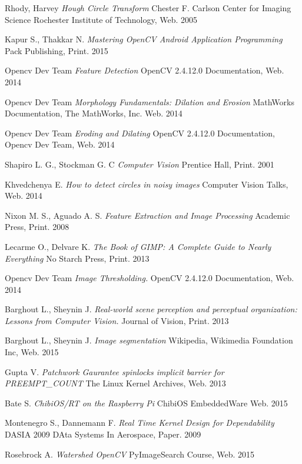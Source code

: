 \documentclass[12pt,twoside,a4paper]{article}
\begin{document}
\begin{thebibliography}{9}
Rhody, Harvey
\textit{Hough Circle Transform} Chester F. Carlson Center for Imaging Science Rochester Institute of Technology, Web. 2005

Kapur S., Thakkar N.
\textit{Mastering OpenCV Android Application Programming} Pack Publishing, Print. 2015

Opencv Dev Team
\textit{Feature Detection} OpenCV 2.4.12.0 Documentation, Web. 2014

Opencv Dev Team
\textit{Morphology Fundamentals: Dilation and Erosion} MathWorks Documentation, The MathWorks, Inc. Web. 2014

Opencv Dev Team
\textit{Eroding and Dilating} OpenCV 2.4.12.0 Documentation, Opencv Dev Team, Web. 2014

Shapiro L. G., Stockman G. C
\textit{Computer Vision} Prentice Hall, Print. 2001

Khvedchenya E.
\textit{How to detect circles in noisy images} Computer Vision Talks, Web. 2014

Nixon M. S., Aguado A. S.
\textit{Feature Extraction and Image Processing} Academic Press, Print. 2008

Lecarme  O., Delvare K.
\textit{The Book of GIMP: A Complete Guide to Nearly Everything} No Starch Press, Print. 2013

Opencv Dev Team
\textit{Image Thresholding.} OpenCV 2.4.12.0 Documentation, Web. 2014

Barghout L., Sheynin J.
\textit{Real-world scene perception and perceptual organization: Lessons from Computer Vision.} Journal of Vision, Print. 2013

Barghout L., Sheynin J.
\textit{Image segmentation} Wikipedia, Wikimedia Foundation Inc, Web. 2015

Gupta V.
\textit{Patchwork Gaurantee spinlocks implicit barrier for PREEMPT\_COUNT} The Linux Kernel Archives, Web. 2013

Bate S.
\textit{ChibiOS/RT on the Raspberry Pi} ChibiOS EmbeddedWare Web. 2015

Montenegro S., Dannemann F. 
\textit{Real Time Kernel Design for Dependability} DASIA 2009 DAta Systems In Aerospace, Paper. 2009

Rosebrock A.
\textit{Watershed OpenCV} PyImageSearch Course, Web. 2015

\end{thebibliography}
\end{document}
